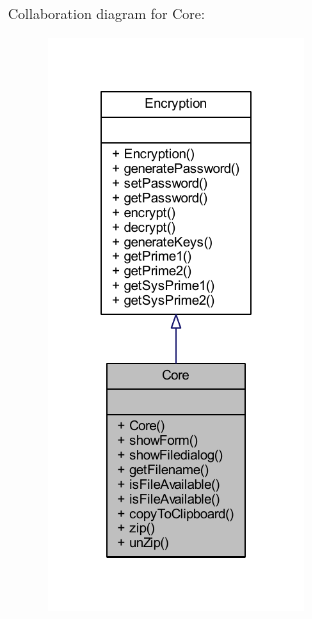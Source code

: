 Collaboration diagram for Core\+:\nopagebreak
\begin{figure}[H]
\begin{center}
\leavevmode
\includegraphics[width=192pt]{class_core__coll__graph}
\end{center}
\end{figure}
